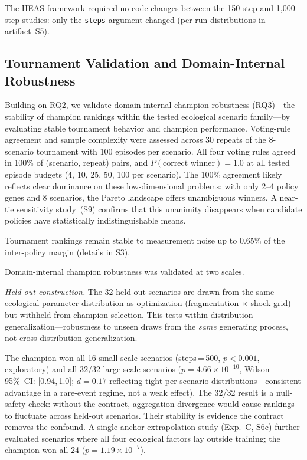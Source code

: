 \documentclass{wscpaperproc}
\begin{document}
The HEAS framework required no code changes between the 150-step
and 1,000-step studies: only the \texttt{steps} argument changed
(per-run distributions in artifact~S5).

\subsection{Tournament Validation and Domain-Internal Robustness}
\label{sec:tournament}

Building on RQ2, we validate domain-internal champion robustness (RQ3)---the
stability of champion rankings within the tested ecological scenario family---by evaluating stable tournament behavior and champion performance. Voting-rule agreement and sample complexity
were assessed across 30 repeats of
the 8-scenario tournament with 100 episodes per scenario. All four voting rules
agreed in 100\% of
(scenario, repeat) pairs, and $P(\text{correct winner})\!=\!1.0$ at all tested
episode budgets (4, 10, 25, 50, 100 per scenario). The 100\% agreement likely
reflects clear dominance on these low-dimensional problems: with only 2--4 policy
genes and 8 scenarios, the Pareto landscape offers unambiguous winners. A
near-tie sensitivity study~(S9) confirms that this unanimity disappears when
candidate policies have statistically indistinguishable means.

Tournament rankings remain stable to measurement noise up to 0.65\% of the inter-policy margin (details in S3).

Domain-internal champion robustness was validated at two scales.

\emph{Held-out construction.} The 32 held-out scenarios are drawn from the
same ecological parameter distribution as optimization (fragmentation $\times$
shock grid) but withheld from champion selection. This tests
within-distribution generalization---robustness to unseen draws from the
\emph{same} generating process, not cross-distribution generalization.

The champion won all 16 small-scale scenarios (steps\,=\,500, $p\!<\!0.001$,
exploratory) and all 32/32 large-scale scenarios
($p\!=\!4.66\!\times\!10^{-10}$, Wilson 95\%~CI: [0.94,\,1.0]; $d\!=\!0.17$
reflecting tight per-scenario distributions---consistent advantage in a
rare-event regime, not a weak effect). The 32/32 result is a null-safety
check: without the contract, aggregation divergence would cause rankings to
fluctuate across held-out scenarios. Their stability is evidence the contract
removes the confound. A single-anchor extrapolation study (Exp.~C, S6c)
further evaluated scenarios where all four ecological factors lay outside
training; the champion won all 24 ($p\!=\!1.19\!\times\!10^{-7}$).
\end{document}
